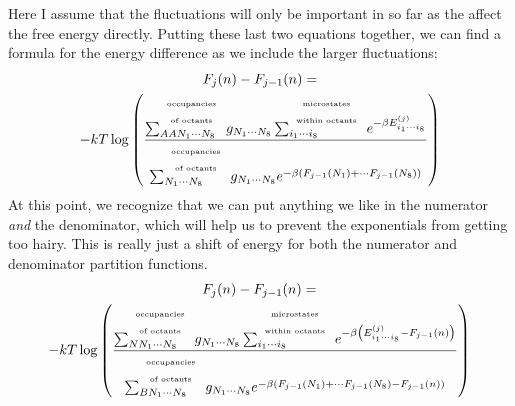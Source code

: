 \documentclass[letterpaper,twocolumn,amsmath,amssymb,pre,aps,10pt]{revtex4-1}
\begin{document}
Here I assume that the fluctuations will only be important in so far
as the affect the free energy directly.  Putting these last two
equations together, we can find a formula for the energy difference as
we include the larger fluctuations:
\begin{multline}
  F_j(n) - F_{j-1}(n) =\\
  -kT\log\left(\frac{
    \sum_{AAN_1\cdots N_8}^{\scriptscriptstyle\begin{array}{c}
                  \text{\tiny occupancies}\\
                  \text{\tiny of octants}\\
                 \end{array}}
       g_{N_1\cdots N_8}
       \sum_{i_1\cdots i_8}^{\scriptscriptstyle\begin{array}{c}
                  \text{\tiny microstates}\\
                  \text{\tiny within octants}\\
                 \end{array}}
       e^{-\beta E_{i_1\cdots i_8}^{(j)}}
  }{
    \sum_{N_1\cdots N_8}^{\scriptscriptstyle\begin{array}{c}
                  \text{\tiny occupancies}\\
                  \text{\tiny of octants}\\
                 \end{array}}
       g_{N_1\cdots N_8}
        e^{-\beta \left( F_{j-1}(N_1) + \cdots F_{j-1}(N_8) \right)}
  }
  \right)
\end{multline}
At this point, we recognize that we can put anything we like in the
numerator \emph{and} the denominator, which will help us to prevent
the exponentials from getting too hairy.  This is really just a shift
of energy for both the numerator and denominator partition functions.
\begin{multline}
  F_j(n) - F_{j-1}(n) =\\
  -kT\log\left(\frac{
    \sum_{NN_1\cdots N_8}^{\scriptscriptstyle\begin{array}{c}
                  \text{\tiny occupancies}\\
                  \text{\tiny of octants}\\
                 \end{array}}
       g_{N_1\cdots N_8}
       \sum_{i_1\cdots i_8}^{\scriptscriptstyle\begin{array}{c}
                  \text{\tiny microstates}\\
                  \text{\tiny within octants}\\
                 \end{array}}
       e^{-\beta \left(E_{i_1\cdots i_8}^{(j)}  - F_{j-1}(n) \right)}
  }{
    \sum_{BN_1\cdots N_8}^{\scriptscriptstyle\begin{array}{c}
                  \text{\tiny occupancies}\\
                  \text{\tiny of octants}\\
                 \end{array}}
       g_{N_1\cdots N_8}
       e^{-\beta \left( F_{j-1}(N_1) + \cdots F_{j-1}(N_8)  - F_{j-1}(n) \right)}
  }
  \right)
\end{multline}
\end{document}
